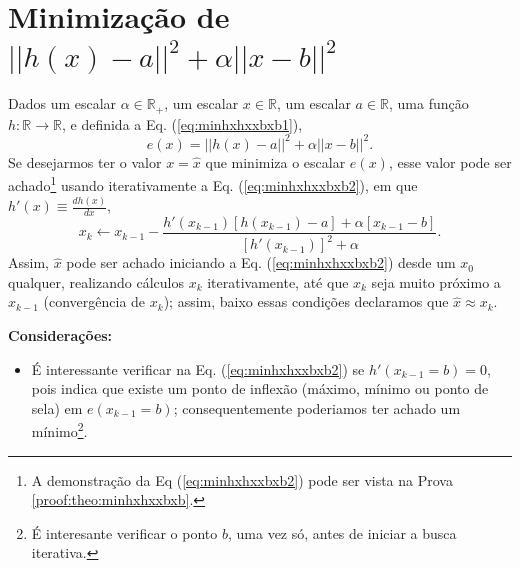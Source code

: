 \section{Minimização de $||h(x)-a||^2+\alpha ||x-b||^2$}


\begin{theorem}\label{theo:minhxhxxbxb}
Dados
um escalar $\alpha \in \mathbb{R}_+$, 
um escalar $x \in \mathbb{R}$, 
um escalar $a \in \mathbb{R}$,  
uma função $h:\mathbb{R} \rightarrow \mathbb{R}$, e 
definida a Eq. (\ref{eq:minhxhxxbxb1}),
\begin{equation}\label{eq:minhxhxxbxb1}
e(x)=||h(x)-a||^2+\alpha ||x-b||^2.
\end{equation}
Se desejarmos ter o valor $x=\hat{x}$ que minimiza o escalar $e(x)$,
esse valor pode ser achado\footnote{A 
demonstração da Eq (\ref{eq:minhxhxxbxb2}) pode ser vista na Prova \ref{proof:theo:minhxhxxbxb}.} 
 usando iterativamente a Eq. (\ref{eq:minhxhxxbxb2}),
em que $h'(x)\equiv \frac{d h(x)}{d x}$,
\begin{equation}\label{eq:minhxhxxbxb2}
x_{k} \leftarrow x_{k-1}-
\frac{ h'(x_{k-1}) \left[h(x_{k-1})-a\right]+\alpha\left[ x_{k-1}-b\right]}{\left[h'(x_{k-1})\right]^2+\alpha}.
\end{equation}
Assim, $\hat{x}$ pode ser achado iniciando a Eq. (\ref{eq:minhxhxxbxb2}) desde um 
$x_{0}$ qualquer, realizando cálculos $x_{k}$ iterativamente, 
até que $x_{k}$ seja muito próximo a $x_{k-1}$ (convergência de $x_{k}$); assim,
baixo essas condições declaramos que $\hat{x} \approx x_{k}$.

\textbf{Considerações:}
\begin{itemize}
\item É interessante verificar na Eq. (\ref{eq:minhxhxxbxb2}) 
se  $h'(x_{k-1}=b) = 0$,
pois indica que existe um ponto de inflexão 
(máximo, mínimo ou ponto de sela) em $e(x_{k-1}=b)$;
consequentemente poderiamos ter achado um mínimo\footnote{É 
interesante verificar o ponto $b$, uma vez só, 
antes de iniciar a busca iterativa.}.
\end{itemize}

\end{theorem}

